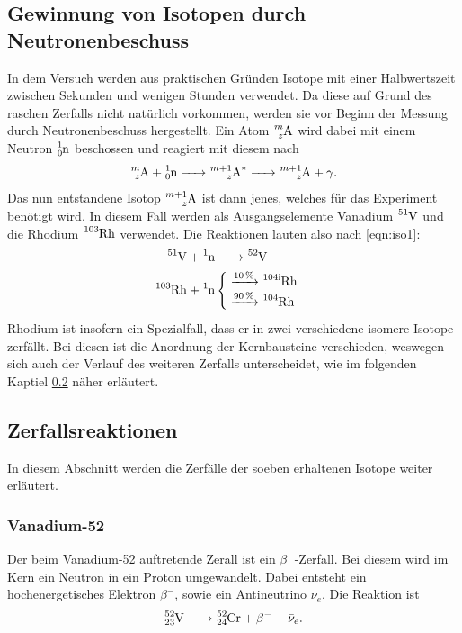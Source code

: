 \subsection{Gewinnung von Isotopen durch Neutronenbeschuss}
\label{sec:Neutronenbeschuss}
In dem Versuch werden aus praktischen Gründen Isotope mit einer Halbwertszeit zwischen Sekunden und 
wenigen Stunden verwendet. Da diese auf Grund des raschen Zerfalls nicht natürlich vorkommen, werden 
sie vor Beginn der Messung durch Neutronenbeschuss hergestellt. Ein Atom $\ce{^{m}_{z}A}$ wird dabei 
mit einem Neutron $\ce{^{1}_{0}n}$ beschossen und reagiert mit diesem nach
\begin{equation}
    \ce{^{m}_{z}A}+\ce{^{1}_{0}n -> ^{m + 1}_{z}A^* -> ^{m + 1}_{z}A}+\gamma.
    \label{eqn:iso1}
\end{equation}
Das nun entstandene Isotop $\ce{^{m + 1}_{z}A}$ ist dann jenes, welches für das Experiment benötigt
wird. In diesem Fall werden als Ausgangselemente Vanadium $\ce{^{51}V}$ und die Rhodium $\ce{^{103}Rh}$
verwendet. Die Reaktionen lauten also nach \ref{eqn:iso1}:
\begin{align*}
    \ce{^{51}V}+\ce{^{1}n&->^{52}V}\\
    \ce{^{103}Rh}+\ce{^{1}n}&
    \begin{cases}
        \ce{->[10\%]^{104 i}Rh}\\
        \ce{->[90\%]^{104}Rh}
    \end{cases}
\end{align*}
Rhodium ist insofern ein Spezialfall, dass er in zwei verschiedene isomere Isotope zerfällt. Bei diesen
ist die Anordnung der Kernbausteine verschieden, weswegen sich auch der Verlauf des weiteren Zerfalls
unterscheidet, wie im folgenden Kaptiel \ref{sec:Zerfallsreaktionen} näher erläutert. 
\subsection{Zerfallsreaktionen}
\label{sec:Zerfallsreaktionen}
In diesem Abschnitt werden die Zerfälle der soeben erhaltenen Isotope weiter erläutert.
\subsubsection*{Vanadium-52} 
Der beim Vanadium-52 auftretende Zerall ist ein $\beta^-$-Zerfall. Bei diesem wird im Kern ein Neutron
in ein Proton umgewandelt. Dabei entsteht ein hochenergetisches Elektron $\beta^-$, sowie ein 
Antineutrino $\bar{\nu}_e$. Die Reaktion ist
\begin{equation}
    \ce{^{52}_{23}V -> ^{52}_{24}Cr}+\beta^-+\bar{\nu}_e. 
    \label{eqn:VZerfall}
\end{equation}
